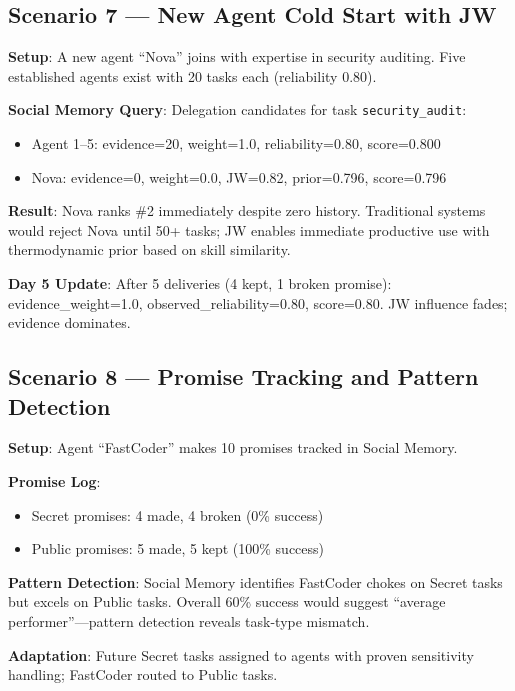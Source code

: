 \documentclass[11pt]{article}
\begin{document}
\subsection{Scenario 7 --- New Agent Cold Start with JW}

\noindent\textbf{Setup}: A new agent ``Nova'' joins with expertise in security
auditing. Five established agents exist with 20 tasks each (reliability 0.80).

\noindent\textbf{Social Memory Query}: Delegation candidates for task
\texttt{security\_audit}:
\begin{itemize}[noitemsep,topsep=2pt]
  \item Agent 1--5: evidence=20, weight=1.0, reliability=0.80, score=0.800
  \item Nova: evidence=0, weight=0.0, JW=0.82, prior=0.796, score=0.796
\end{itemize}

\noindent\textbf{Result}: Nova ranks \#2 immediately despite zero history.
Traditional systems would reject Nova until 50+ tasks; JW enables immediate
productive use with thermodynamic prior based on skill similarity.

\noindent\textbf{Day 5 Update}: After 5 deliveries (4 kept, 1 broken promise):
evidence\_weight=1.0, observed\_reliability=0.80, score=0.80. JW influence
fades; evidence dominates.

\subsection{Scenario 8 --- Promise Tracking and Pattern Detection}

\noindent\textbf{Setup}: Agent ``FastCoder'' makes 10 promises tracked in Social
Memory.

\noindent\textbf{Promise Log}:
\begin{itemize}[noitemsep,topsep=2pt]
  \item Secret promises: 4 made, 4 broken (0\% success)
  \item Public promises: 5 made, 5 kept (100\% success)
\end{itemize}

\noindent\textbf{Pattern Detection}: Social Memory identifies FastCoder chokes on
Secret tasks but excels on Public tasks. Overall 60\% success would suggest
``average performer''---pattern detection reveals task-type mismatch.

\noindent\textbf{Adaptation}: Future Secret tasks assigned to agents with proven
sensitivity handling; FastCoder routed to Public tasks.
\end{document}
